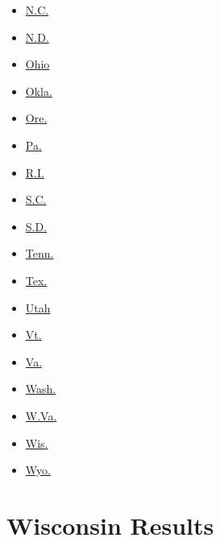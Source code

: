 \begin{itemize}
\tightlist
\item
  \href{//www.nytimes3xbfgragh.onion/elections/2016/results/north-carolina}{N.C.}
\item
  \href{//www.nytimes3xbfgragh.onion/elections/2016/results/north-dakota}{N.D.}
\item
  \href{//www.nytimes3xbfgragh.onion/elections/2016/results/ohio}{Ohio}
\item
  \href{//www.nytimes3xbfgragh.onion/elections/2016/results/oklahoma}{Okla.}
\item
  \href{//www.nytimes3xbfgragh.onion/elections/2016/results/oregon}{Ore.}
\item
  \href{//www.nytimes3xbfgragh.onion/elections/2016/results/pennsylvania}{Pa.}
\item
  \href{//www.nytimes3xbfgragh.onion/elections/2016/results/rhode-island}{R.I.}
\item
  \href{//www.nytimes3xbfgragh.onion/elections/2016/results/south-carolina}{S.C.}
\item
  \href{//www.nytimes3xbfgragh.onion/elections/2016/results/south-dakota}{S.D.}
\item
  \href{//www.nytimes3xbfgragh.onion/elections/2016/results/tennessee}{Tenn.}
\item
  \href{//www.nytimes3xbfgragh.onion/elections/2016/results/texas}{Tex.}
\end{itemize}

\begin{itemize}
\tightlist
\item
  \href{//www.nytimes3xbfgragh.onion/elections/2016/results/utah}{Utah}
\item
  \href{//www.nytimes3xbfgragh.onion/elections/2016/results/vermont}{Vt.}
\item
  \href{//www.nytimes3xbfgragh.onion/elections/2016/results/virginia}{Va.}
\item
  \href{//www.nytimes3xbfgragh.onion/elections/2016/results/washington}{Wash.}
\item
  \href{//www.nytimes3xbfgragh.onion/elections/2016/results/west-virginia}{W.Va.}
\item
  \href{//www.nytimes3xbfgragh.onion/elections/2016/results/wisconsin}{Wis.}
\item
  \href{//www.nytimes3xbfgragh.onion/elections/2016/results/wyoming}{Wyo.}
\end{itemize}

\hypertarget{wisconsin-results}{%
\section{Wisconsin Results}\label{wisconsin-results}}

